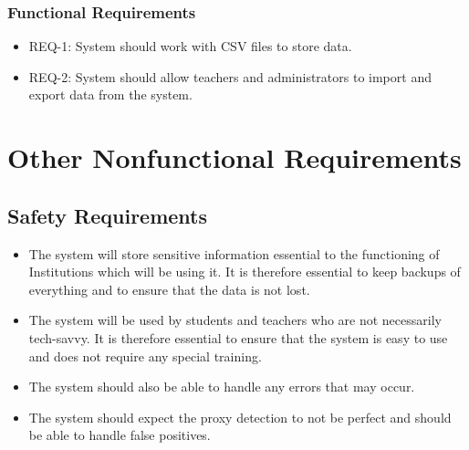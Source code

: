 \documentclass{scrreprt}
\begin{document}
\subsection{Functional Requirements}
\begin{itemize}
    \item REQ-1: System should work with CSV files to store data.
    \item REQ-2: System should allow teachers and administrators to import and export data from the system.
\end{itemize}


\chapter{Other Nonfunctional Requirements}


\section{Safety Requirements}

\begin{itemize}
    \item The system will store sensitive information essential to the functioning of Institutions which will be using it.
        It is therefore essential to keep backups of everything and to ensure that the data is not lost.
    \item The system will be used by students and teachers who are not necessarily tech-savvy.
        It is therefore essential to ensure that the system is easy to use and does not require any special training.
    \item The system should also be able to handle any errors that may occur.
    \item The system should expect the proxy detection to not be perfect and should be able to handle false positives.

\end{itemize}
\end{document}
